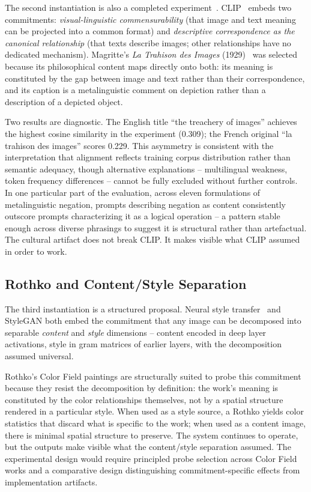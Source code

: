 \documentclass[
  twocolumn,
]{ceurart}
\begin{document}
The second instantiation is also a completed experiment~\cite{SassoliRuskov2025}. CLIP~\cite{radford_learning_2021} embeds two commitments: \emph{visual-linguistic commensurability} (that image and text meaning can be projected into a common format) and \emph{descriptive correspondence as the canonical relationship} (that texts describe images; other relationships have no dedicated mechanism). Magritte's \emph{La Trahison des Images} (1929)~\cite{foucault_this_1984} was selected because its philosophical content maps directly onto both: its meaning is constituted by the gap between image and text rather than their correspondence, and its caption is a metalinguistic comment on depiction rather than a description of a depicted object.

Two results are diagnostic. The English title ``the treachery of images'' achieves the highest cosine similarity in the experiment (0.309); the French original ``la trahison des images'' scores 0.229. This asymmetry is consistent with the interpretation that alignment reflects training corpus distribution rather than semantic adequacy, though alternative explanations -- multilingual weakness, token frequency differences -- cannot be fully excluded without further controls. In one particular part of the evaluation, across eleven formulations of metalinguistic negation, prompts describing negation as content consistently outscore prompts characterizing it as a logical operation -- a pattern stable enough across diverse phrasings to suggest it is structural rather than artefactual. The cultural artifact does not break CLIP. It makes visible what CLIP assumed in order to work.

\subsection{Rothko and Content/Style Separation}

The third instantiation is a structured proposal. Neural style transfer~\cite{Gatys2015} and StyleGAN both embed the commitment that any image can be decomposed into separable \emph{content} and \emph{style} dimensions -- content encoded in deep layer activations, style in gram matrices of earlier layers, with the decomposition assumed universal.

Rothko's Color Field paintings are structurally suited to probe this commitment because they resist the decomposition by definition: the work's meaning is constituted by the color relationships themselves, not by a spatial structure rendered in a particular style. When used as a style source, a Rothko yields color statistics that discard what is specific to the work; when used as a content image, there is minimal spatial structure to preserve. The system continues to operate, but the outputs make visible what the content/style separation assumed. The experimental design would require principled probe selection across Color Field works and a comparative design distinguishing commitment-specific effects from implementation artifacts.
\end{document}
